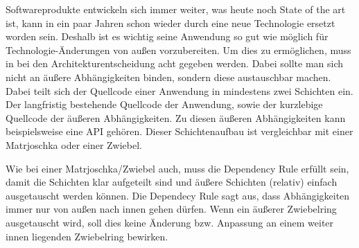 Softwareprodukte entwickeln sich immer weiter, was heute noch State of the art ist, kann in ein paar Jahren schon wieder durch eine neue Technologie ersetzt worden sein. Deshalb ist es wichtig seine Anwendung so gut wie möglich für Technologie-Änderungen von außen vorzubereiten. Um dies zu ermöglichen, muss in bei den Architekturentscheidung acht gegeben werden. Dabei sollte man sich nicht an äußere Abhängigkeiten binden, sondern diese austauschbar machen. Dabei teilt sich der Quellcode einer Anwendung in mindestens zwei Schichten ein. Der langfristig bestehende Quellcode der Anwendung, sowie der kurzlebige Quellcode der äußeren Abhängigkeiten. Zu diesen äußeren Abhängigkeiten kann beispielsweise eine API gehören. Dieser Schichtenaufbau ist vergleichbar mit einer Matrjoschka oder einer Zwiebel.

Wie bei einer Matrjoschka/Zwiebel auch, muss die Dependency Rule erfüllt sein, damit die Schichten klar aufgeteilt sind und äußere Schichten (relativ) einfach ausgetauscht werden können. Die Dependecy Rule sagt aus, dass Abhängigkeiten immer nur von außen nach innen gehen dürfen. Wenn ein äußerer Zwiebelring ausgetauscht wird, soll dies keine Änderung bzw. Anpassung an einem weiter innen liegenden Zwiebelring bewirken.

